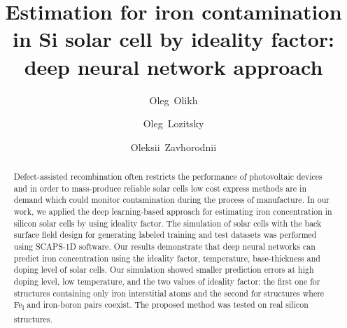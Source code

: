 \documentclass[num-refs]{wiley-article} %
\title{Estimation for iron contamination in Si solar cell by ideality factor: deep neural network approach}
\author[1]{Oleg~Olikh}
\author[1]{Oleg~Lozitsky}
\author[1]{Oleksii~Zavhorodnii}
\affil[1]{Taras Shevchenko National University of Kyiv, 64/13, Volodymyrska Street, Kyiv, 01601, Ukraine}
\begin{document}
\begin{frontmatter}
\maketitle

\begin{abstract}
Defect-assisted recombination often restricts the performance of photovoltaic devices
and in order to mass-produce reliable solar cells low cost express methods are in demand
which could monitor contamination during the process of manufacture.
In our work, we applied the deep learning-based approach for estimating iron concentration
in silicon solar cells by using ideality factor.
The simulation of solar cells with the back surface field design
for generating labeled training and test datasets was performed using SCAPS-1D software.
Our results demonstrate that deep neural networks can predict iron concentration using
the ideality factor, temperature, base-thickness and doping level of  solar cells.
Our simulation showed  smaller prediction errors at high doping level,
low temperature, and the two values of ideality factor:
the first one for structures containing only iron interstitial atoms
and the second for structures where Fe\textsubscript{i} and iron-boron pairs coexist.
The proposed method was tested on real silicon structures.

\end{abstract}

\end{frontmatter}

\end{document}
